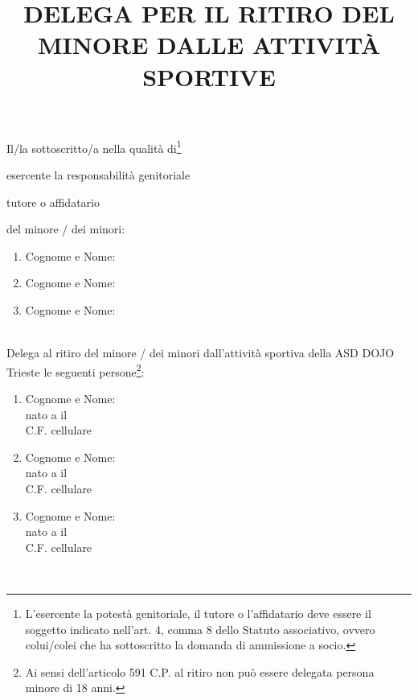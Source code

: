 \documentclass{djtsmod}
\title{DELEGA PER IL RITIRO DEL MINORE DALLE ATTIVITÀ SPORTIVE}
\begin{document}
	\maketitle
	
	Il/la sottoscritto/a \fieldfill\; nella qualità di\footnote{L'esercente la potestà genitoriale, il tutore o l'affidatario deve essere il soggetto indicato nell'art. 4, comma 8 dello Statuto associativo, ovvero colui/colei che ha sottoscritto la domanda di ammissione a socio.}
	\begin{radiolist}
		\item esercente la responsabilità genitoriale  
		\item tutore o affidatario
	\end{radiolist}
	del minore / dei minori: \\
	\begin{minipage}{0.8\textwidth}
		\begin{enumerate}
			\item Cognome e Nome: \fieldfill
			\item Cognome e Nome: \fieldfill
			\item Cognome e Nome: \fieldfill
		\end{enumerate}
	\end{minipage} \\[20pt]
	Delega al ritiro del minore / dei minori dall'attività sportiva della ASD DOJO Trieste le seguenti persone\footnote{Ai sensi dell'articolo 591 C.P. al ritiro non può essere delegata persona minore di 18 anni.}: \\
	\begin{minipage}{0.8\linewidth}
		\begin{enumerate}
			\item Cognome e Nome: \fieldfill \\
			nato a \field{6cm} il \fieldfill \\
			C.F. \field{6cm} cellulare \fieldfill
			\item Cognome e Nome: \fieldfill \\
			nato a \field{6cm} il \fieldfill \\
			C.F. \field{6cm} cellulare \fieldfill
			\item Cognome e Nome: \fieldfill \\
			nato a \field{6cm} il \fieldfill \\
			C.F. \field{6cm} cellulare \fieldfill
		\end{enumerate}
	\end{minipage} \\[5pt]
\end{document}
